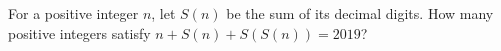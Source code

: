 For a positive integer $n$, let $S(n)$ be the sum of its decimal digits. How many positive integers satisfy $n+S(n)+S(S(n))=2019$?
